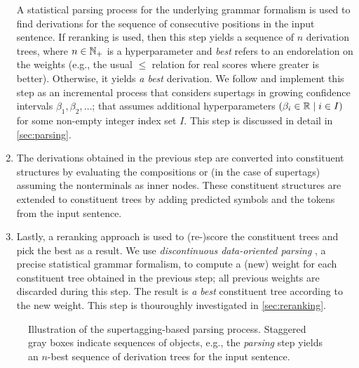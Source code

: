 \documentclass[../document.tex]{subfiles}
\begin{document}
\begin{enumerate}
            A statistical parsing process for the underlying grammar formalism is used to find derivations for the sequence of consecutive positions in the input sentence.
            If reranking is used, then this step yields a sequence of \(n\) derivation trees, where \(n \in \mathbb{N}_+\) is a hyperparameter and \emph{best} refers to an endorelation on the weights (e.g., the usual \(\leq\) relation for real scores where greater is better).
            Otherwise, it yields \emph{a best} derivation.
            We follow \citet{Auli12} and implement this step as an incremental process that considers supertags in growing confidence intervals \(\beta_1, \beta_2, \ldots\); that assumes additional hyperparameters \((\beta_i \in \mathbb{R} \mid i \in I)\) for some non-empty integer index set \(I\).
            This step is discussed in detail in \cref{sec:parsing}.
        \item\label{parsing:item:3}
            The derivations obtained in the previous step are converted into constituent structures by evaluating the  compositions or (in the case of  supertags) assuming the nonterminals as inner nodes.
            These constituent structures are extended to constituent trees by adding predicted  symbols and the tokens from the input sentence.
        \item\label{parsing:item:4}
            Lastly, a reranking approach is used to (re-)score the constituent trees and pick the best as a result.
            We use \emph{discontinuous data-oriented parsing} \citep{CraSchBod16}, a precise statistical grammar formalism, to compute a (new) weight for each constituent tree obtained in the previous step; all previous weights are discarded during this step.
            The result is \emph{a best} constituent tree according to the new weight.
            This step is thouroughly investigated in \cref{sec:reranking}.
    \end{enumerate}

    \begin{figure}
        
        \caption{\label{fig:parsing:overview}
            Illustration of the supertagging-based parsing process.
            Staggered gray boxes indicate sequences of objects, e.g.\@, the \emph{parsing} step yields an \(n\)-best sequence of derivation trees for the input sentence.
        }
    \end{figure}

    
    

    \ifSubfilesClassLoaded{%
        \printindex
    }{}
\end{document}
